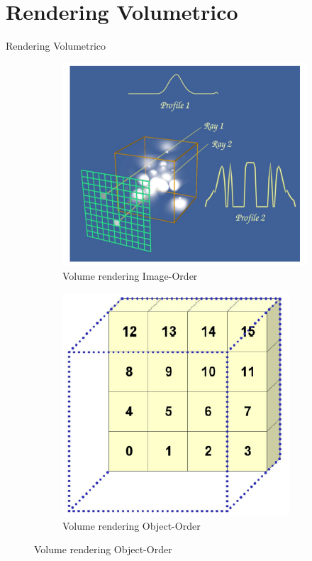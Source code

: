 \documentclass{beamer}
\begin{document}
	
	\section{Rendering Volumetrico}
	\begin{frame}{Rendering Volumetrico}
	
	\begin{figure}
		\centering
		\begin{subfigure}{.4\textwidth}
  			\centering
  			\includegraphics[width=.9\linewidth]{Images/imageorder.png}
  			\caption{Volume rendering Image-Order}
		\end{subfigure}
		\begin{subfigure}{.4\textwidth}
  			\centering
  			\includegraphics[width=.8\linewidth]{Images/objectorder.png}
  			\caption{Volume rendering Object-Order}
		\end{subfigure}
	\end{figure}	
	

\end{frame}
\end{document}
